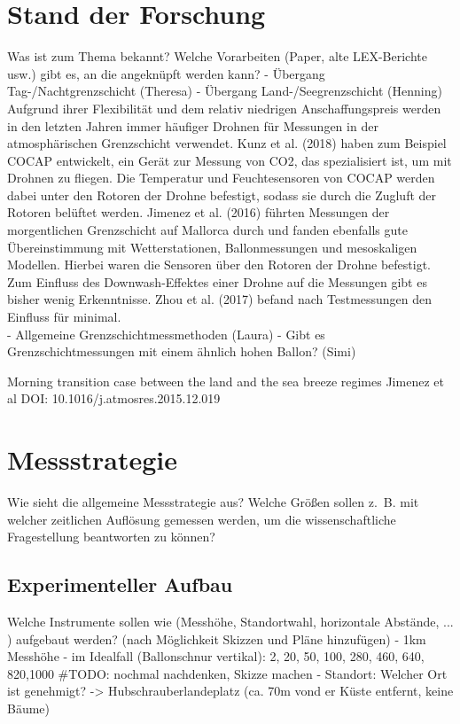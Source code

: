 \documentclass[a4paper,11pt,DIV=calc,tablecaptionabove,headinclude,twoside]{article}
\begin{document}
\section{Stand der Forschung}
Was ist zum Thema bekannt? Welche Vorarbeiten (Paper, alte LEX-Berichte usw.) gibt es, an die angeknüpft werden kann?
- Übergang Tag-/Nachtgrenzschicht (Theresa)
- Übergang Land-/Seegrenzschicht (Henning)
Aufgrund ihrer Flexibilität und dem relativ niedrigen Anschaffungspreis werden
in den letzten Jahren immer häufiger Drohnen für Messungen in der atmosphärischen
Grenzschicht verwendet.
Kunz et al. (2018) haben zum Beispiel COCAP entwickelt, ein Gerät zur Messung von
CO2, das spezialisiert ist, um mit Drohnen zu fliegen. Die Temperatur und Feuchtesensoren
von COCAP werden dabei unter den Rotoren der Drohne befestigt, sodass sie durch die 
Zugluft der Rotoren belüftet werden. Jimenez et al. (2016) führten Messungen der morgentlichen Grenzschicht
auf Mallorca durch und fanden ebenfalls gute Übereinstimmung mit Wetterstationen, 
Ballonmessungen und mesoskaligen Modellen. Hierbei waren die Sensoren über den Rotoren
der Drohne befestigt.\\
Zum Einfluss des Downwash-Effektes einer Drohne auf die Messungen gibt es bisher
wenig Erkenntnisse. Zhou et al. (2017) befand nach Testmessungen den Einfluss für
minimal.\\
- Allgemeine Grenzschichtmessmethoden (Laura)
- Gibt es Grenzschichtmessungen mit einem ähnlich hohen Ballon? (Simi)

Morning transition case between the land and the sea breeze regimes Jimenez et
al
DOI: 10.1016/j.atmosres.2015.12.019

\section{Messstrategie}
Wie sieht die allgemeine Messstrategie aus? Welche Größen sollen z.~B. mit welcher zeitlichen Auflösung gemessen werden, um die wissenschaftliche Fragestellung beantworten zu können?
\subsection{Experimenteller Aufbau}
Welche Instrumente sollen wie (Messhöhe, Standortwahl, horizontale Abstände, ... ) aufgebaut werden? (nach Möglichkeit Skizzen und Pläne hinzufügen)
- 1km Messhöhe
- im Idealfall (Ballonschnur vertikal): 2, 20, 50, 100, 280, 460, 640, 820,1000 #TODO: nochmal nachdenken, Skizze machen
- Standort: Welcher Ort ist genehmigt? -> Hubschrauberlandeplatz (ca. 70m vond er Küste entfernt, keine Bäume)
\end{document}
